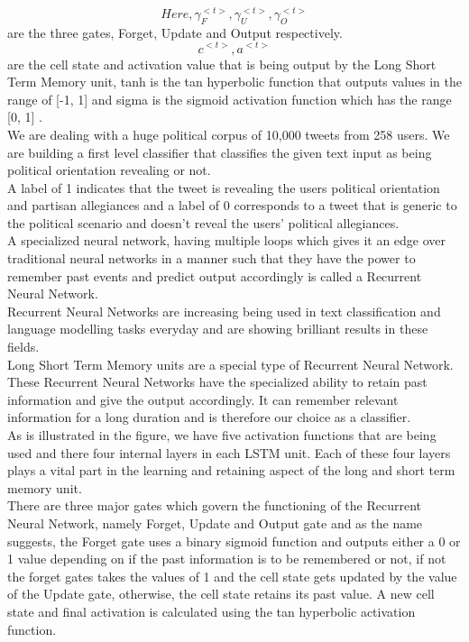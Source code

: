 \documentclass[a4paper,11pt]{article}
\begin{document}
\[Here,  \gamma_F^{<t>}, \gamma_U^{<t>}, \gamma_O^{<t>} \]  are  the  three gates, Forget, Update and Output respectively. 
\[c^{<t>}, a^{<t>}  \] are the cell state and activation value that is being output by the Long Short Term Memory unit, tanh is the tan hyperbolic function that outputs values in the range of [-1, 1] and sigma is the sigmoid activation function which has the range [0, 1] .
\medskip\\
We are dealing with a huge political corpus of 10,000 tweets from 258 users.
We are building a first level classifier that classifies the given text input as being political orientation revealing or not. 
\medskip\\
A label of 1 indicates that the tweet is revealing the users political orientation and partisan allegiances and a label of 0 corresponds to a tweet that is generic to the political scenario and doesn't reveal the users' political allegiances.
\medskip\\
A specialized neural network, having multiple loops which gives it an edge over traditional neural networks in a manner such that they have the power to remember past events and predict output accordingly is called a Recurrent Neural Network.
\medskip\\
Recurrent Neural Networks are increasing being used in text classification and language modelling tasks everyday and are showing brilliant results in these fields.
\medskip\\
Long Short Term Memory units are a special type of Recurrent Neural Network. These Recurrent Neural Networks have the specialized ability to retain past information and give the output accordingly. It can remember relevant information for a long duration and is therefore our choice as a classifier.
\medskip\\
As is illustrated in the figure, we have five activation functions that are being used and there four internal layers in each LSTM unit. Each of these four layers plays a vital part in the learning and retaining aspect of the long and short term memory unit.
\medskip\\
There are three major gates which govern the functioning of the Recurrent Neural Network, namely Forget, Update and Output gate and as the name suggests, the Forget gate uses a binary sigmoid function and outputs either a 0 or 1 value depending on if the past information is to be remembered or not, if not the forget gates takes the values of 1 and the cell state gets updated by the value of the Update gate, otherwise, the cell state retains its past value. A new cell state and final activation is calculated using the tan hyperbolic activation function.
\end{document}
